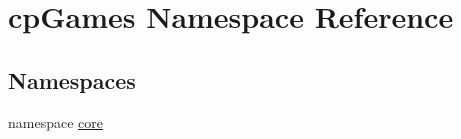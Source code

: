 \hypertarget{namespacecp_games}{}\section{cp\+Games Namespace Reference}
\label{namespacecp_games}
\subsection*{Namespaces}
\begin{DoxyCompactItemize}
\item 
namespace \mbox{\hyperlink{namespacecp_games_1_1core}{core}}
\end{DoxyCompactItemize}
